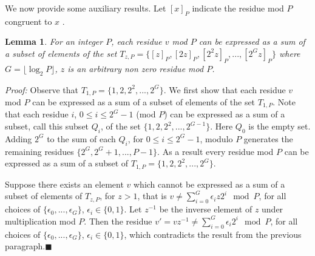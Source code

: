 \documentclass[12pt]{article} \pagestyle{plain} \topmargin
\newtheorem{lemma}{Lemma}
\begin{document}
We now provide some auxiliary results. Let $[x]_P$ indicate the
residue mod $P$ congruent to $x$ .

\begin{lemma}\label{generates} For an integer $P$, each residue $v$ mod $P$ can be expressed as a
sum of a subset of elements of the set
$T_{z,P}=\{[z]_P,[2z]_P,[2^2z]_P,...,[2^{G}z]_P\}$ where
$G=\lfloor \log_2 P \rfloor $, $z$ is an arbitrary non zero
residue mod $P$.
\end{lemma}

\noindent \textit{Proof:} Observe that
$T_{1,P}=\{1,2,2^2,...,2^{G}\}$. We first show that each residue $v$
mod $P$ can be expressed as a sum of a subset of elements of the set
$T_{1,P}$. Note that each residue $i$, $0 \leq i \leq 2^G-1$ (mod
$P$) can be expressed as a sum of a subset, call this subset $Q_i$,
of the set $\{1,2,2^2,...,2^{G-1}\}$. Here $Q_0$ is the empty set.
Adding $2^G$ to the sum of each $Q_i$, for $0 \leq i \leq 2^G-1$,
modulo $P$ generates the remaining residues $\{2^G, 2^G+1,...,P-1
\}$. As a result every residue mod $P$ can be expressed as a sum of
a subset of $T_{1,P}=\{1,2,2^2,...,2^{G}\}$.

Suppose there exists an element $v$ which cannot be expressed as a
sum of a subset of elements of $T_{z,P}$, for $z>1$, that is $v \neq
\sum_{i=0}^G \epsilon_i z 2^i \mod P$, for all choices of
$\{\epsilon_0,...,\epsilon_G\}$, $\epsilon_i \in \{0,1\}$. Let
$z^{-1}$ be the inverse element of $z$ under multiplication mod $P$.
Then the residue $v' = vz^{-1} \neq \sum_{i=0}^G \epsilon_i 2^i \mod
P$, for all choices of $\{\epsilon_0,...,\epsilon_G\}$, $\epsilon_i
\in \{0,1\}$, which contradicts the result from the previous
paragraph.\hfill$\blacksquare$
\end{document}
